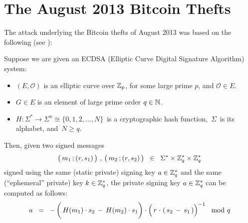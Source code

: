 
\section{The August 2013 Bitcoin Thefts}
\setcounter{theorem}{0}
\setcounter{equation}{0}


The attack underlying the Bitcoin thefts of August 2013 was based
on the following (see \cite{Schneider20130128}):
\begin{proposition}
\mbox{}
\vskip 0.1cm
\noindent
Suppose we are given an ECDSA (Elliptic Curve Digital Signature Algorithm) system:
\begin{itemize}
\item
	$(E,\mathcal{O})$ is an elliptic curve over $\mathbb{Z}_{p}$, for some large prime $p$,
	and $\mathcal{O} \in E$.
\item
	$G \in E$ is an element of large prime order $q \in \mathbb{N}$.
\item
	$H : \Sigma^{*} \longrightarrow \Sigma^{n} \cong \{0,1,2,\ldots,N\}$\,
	is a cryptographic hash function,
	\,$\Sigma$\, is its alphabet, and \,$N \geq q$.
\end{itemize}
Then, given two signed messages
\begin{equation*}
\left(\,m_{1}\,\overset{{\color{white}.}}{;}\,(r,s_{1})\,\right)
\,,\,
\left(\,m_{2}\,\overset{{\color{white}.}}{;}\,(r,s_{2})\,\right)
\;\; \in \;\;
	\Sigma^{*} \times \Z_{q}^{*} \times \Z_{q}^{*}
\end{equation*}
signed using the same (static private) signing key $a \in \mathbb{Z}_{q}^{*}$ and
the same (``ephemeral'' private) key $k \in \mathbb{Z}_{q}^{*}$,
the private signing key $a \in \mathbb{Z}_{q}^{*}$ can be computed as follows:
\begin{equation*}
a
\;\;=\;\;
	- \left(\,H(m_{1}) \cdot s_{2} \, \overset{{\color{white}1}}{-} \, H(m_{2}) \cdot s_{1} \right)
	\cdot
	\left(\,r \overset{{\color{white}1}}{\cdot} \left(\, s_{2} \,-\, s_{1} \,\right)\right)^{-1}
	 \mod q
\end{equation*}
\end{proposition}

\proof

